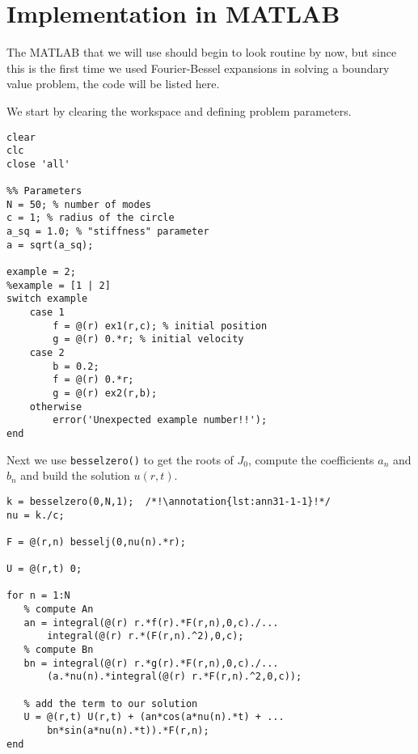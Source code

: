 \section{Implementation in MATLAB}
The MATLAB that we will use should begin to look routine by now, but since this is the first time we used Fourier-Bessel expansions in solving a boundary value problem, the code will be listed here.

\vspace{0.25cm}

\noindent We start by clearing the workspace and defining problem parameters.
\begin{lstlisting}[name=lec31-ex1, style=myMatlab]
clear
clc
close 'all'

%% Parameters
N = 50; % number of modes
c = 1; % radius of the circle
a_sq = 1.0; % "stiffness" parameter
a = sqrt(a_sq);

example = 2;
%example = [1 | 2]
switch example
    case 1        
        f = @(r) ex1(r,c); % initial position
        g = @(r) 0.*r; % initial velocity
    case 2
        b = 0.2;
        f = @(r) 0.*r;
        g = @(r) ex2(r,b);
    otherwise
        error('Unexpected example number!!');
end
\end{lstlisting}
Next we use \lstinline[style=myMatlab]{besselzero()} to get the roots of $J_0$, compute the coefficients $a_n$ and $b_n$ and build the solution $u(r,t)$.
\begin{lstlisting}[name=lec31-ex1,style=myMatlab]
%% Get eigenvalues
k = besselzero(0,N,1);  /*!\annotation{lst:ann31-1-1}!*/
nu = k./c;

F = @(r,n) besselj(0,nu(n).*r);

U = @(r,t) 0;

for n = 1:N
   % compute An
   an = integral(@(r) r.*f(r).*F(r,n),0,c)./...
       integral(@(r) r.*(F(r,n).^2),0,c);
   % compute Bn
   bn = integral(@(r) r.*g(r).*F(r,n),0,c)./...
       (a.*nu(n).*integral(@(r) r.*F(r,n).^2,0,c));
   
   % add the term to our solution
   U = @(r,t) U(r,t) + (an*cos(a*nu(n).*t) + ...
       bn*sin(a*nu(n).*t)).*F(r,n);
end
\end{lstlisting}

\vspace{0.25cm}

